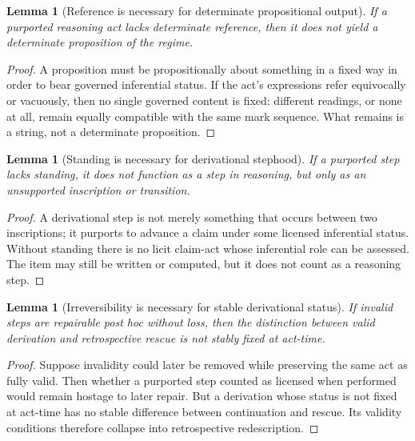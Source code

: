 \documentclass[11pt]{article}
\theoremstyle{plain}
\newtheorem{lemma}[theorem]{Lemma}
\theoremstyle{definition}
\begin{document}
\begin{lemma}[Reference is necessary for determinate propositional output]
\label{lem:A-reference}
If a purported reasoning act lacks determinate reference, then it does not yield a determinate proposition of the regime.
\end{lemma}

\begin{proof}
A proposition must be propositionally about something in a fixed way in order to bear governed inferential status. If the act's expressions refer equivocally or vacuously, then no single governed content is fixed: different readings, or none at all, remain equally compatible with the same mark sequence. What remains is a string, not a determinate proposition.
\end{proof}

\begin{lemma}[Standing is necessary for derivational stephood]
\label{lem:A-standing}
If a purported step lacks standing, it does not function as a step in reasoning, but only as an unsupported inscription or transition.
\end{lemma}

\begin{proof}
A derivational step is not merely something that occurs between two inscriptions; it purports to advance a claim under some licensed inferential status. Without standing there is no licit claim-act whose inferential role can be assessed. The item may still be written or computed, but it does not count as a reasoning step.
\end{proof}

\begin{lemma}[Irreversibility is necessary for stable derivational status]
\label{lem:A-irreversibility}
If invalid steps are repairable post hoc without loss, then the distinction between valid derivation and retrospective rescue is not stably fixed at act-time.
\end{lemma}

\begin{proof}
Suppose invalidity could later be removed while preserving the same act as fully valid. Then whether a purported step counted as licensed when performed would remain hostage to later repair. But a derivation whose status is not fixed at act-time has no stable difference between continuation and rescue. Its validity conditions therefore collapse into retrospective redescription.
\end{proof}
\end{document}

